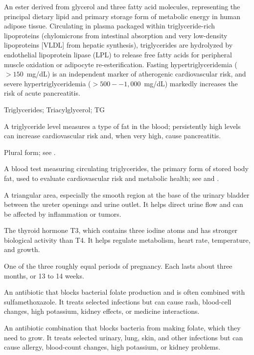  An ester derived from glycerol and three fatty acid molecules, representing the principal dietary lipid and primary storage form of metabolic energy in human adipose tissue. Circulating in plasma packaged within triglyceride-rich lipoproteins (chylomicrons from intestinal absorption and very low-density lipoproteins [VLDL] from hepatic synthesis), triglycerides are hydrolyzed by endothelial lipoprotein lipase (LPL) to release free fatty acids for peripheral muscle oxidation or adipocyte re-esterification. Fasting hypertriglyceridemia ($>150$~mg/dL) is an independent marker of atherogenic cardiovascular risk, and severe hypertriglyceridemia ($>500--1,000$~mg/dL) markedly increases the risk of acute pancreatitis.

\synonyms
Triglycerides; Triacylglycerol; TG

 A triglyceride level measures a type of fat in the blood; persistently high levels can increase cardiovascular risk and, when very high, cause pancreatitis.

 Plural form; see .

 A blood test measuring circulating triglycerides, the primary form of stored body fat, used to evaluate cardiovascular risk and metabolic health; see  and .

 A triangular area, especially the smooth region at the base of the urinary bladder between the ureter openings and urine outlet. It helps direct urine flow and can be affected by inflammation or tumors.

 The thyroid hormone T3, which contains three iodine atoms and has stronger biological activity than T4. It helps regulate metabolism, heart rate, temperature, and growth.

 One of the three roughly equal periods of pregnancy. Each lasts about three months, or 13 to 14 weeks.

 An antibiotic that blocks bacterial folate production and is often combined with sulfamethoxazole. It treats selected infections but can cause rash, blood-cell changes, high potassium, kidney effects, or medicine interactions.

 An antibiotic combination that blocks bacteria from making folate, which they need to grow. It treats selected urinary, lung, skin, and other infections but can cause allergy, blood-count changes, high potassium, or kidney problems.

